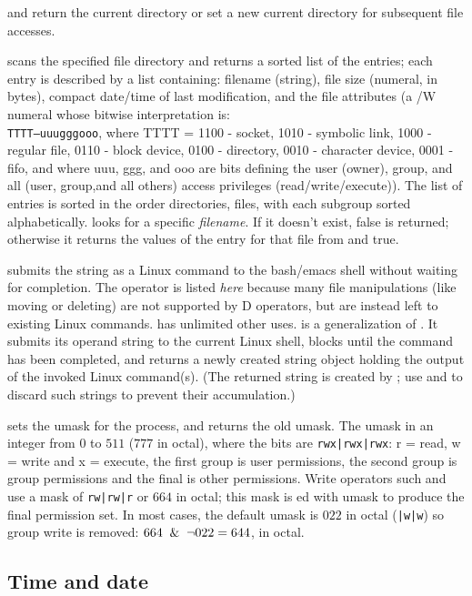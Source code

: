  and  return the current directory or set a
new current directory for subsequent file accesses.

 scans the specified file directory and returns a sorted
list of the entries; each entry is described by a list containing:
filename (string), file size (numeral, in bytes), compact date/time of
last modification, and the file attributes (a /W numeral whose bitwise
interpretation is: \\\texttt {TTTT---uuugggooo}, where TTTT = 1100 -
socket, 1010 - symbolic link, 1000 - regular file, 0110 - block
device, 0100 - directory, 0010 - character device, 0001 - fifo, and
where uuu, ggg, and ooo are bits defining the user (owner), group, and
all (user, group,and all others) access privileges
(read/write/execute)). The list of entries is sorted in the order
directories, files, with each subgroup sorted
alphabetically.  looks for a specific \emph{filename}.
If it doesn't exist, false is returned; otherwise it returns the
values of the entry for that file from  and true.

 submits the string as a Linux command to the bash/emacs
shell without waiting for completion. The operator is listed
\emph{here} because many file manipulations (like moving or deleting)
are not supported by D operators, but are instead left to existing
Linux commands.  has unlimited other
uses.  is a generalization of . It submits
its operand string to the current Linux shell, blocks until the
command has been completed, and returns a newly created string object
holding the output of the invoked Linux command(s). (The returned
string is created by ; use  and 
to discard such strings to prevent their accumulation.)

 sets the umask for the process, and returns the old
umask. The umask in an integer from $0$ to $511$ ($777$ in octal),
where the bits are \texttt{rwx|rwx|rwx}: r = read, w = write and x =
execute, the first group is user permissions, the second group is
group permissions and the final is other permissions. Write operators
such  and  use a mask of
\texttt{rw|rw|r} or $664$ in octal; this mask is ed with
 umask to produce the final permission set. In most cases,
the default umask is $022$ in octal (\texttt{|w|w}) so group write is
removed: $664\And\neg022 = 644$, in octal.

\subsection{Time and date}

